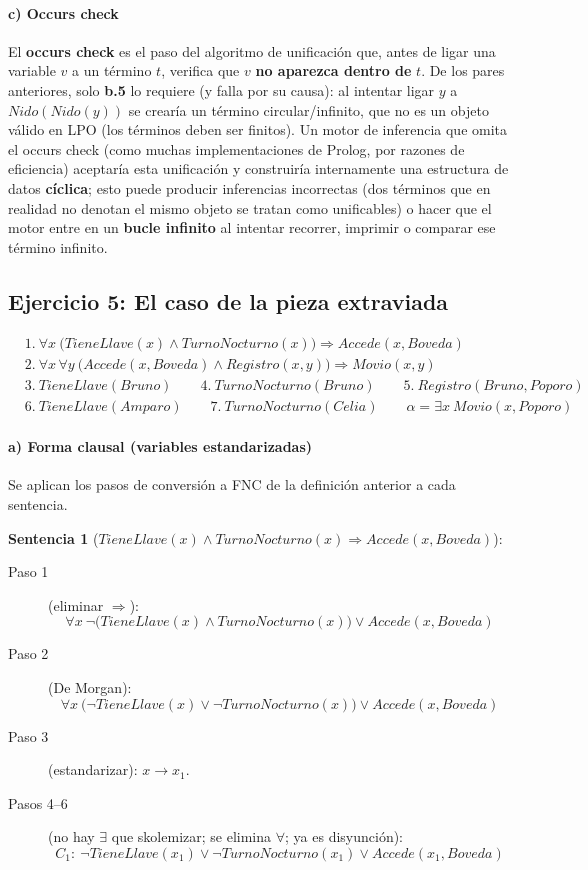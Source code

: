 \paragraph{c) Occurs check}
El \textbf{occurs check} es el paso del algoritmo de unificación que, antes de ligar una variable $v$
a un término $t$, verifica que $v$ \textbf{no aparezca dentro de} $t$. De los pares anteriores, solo
\textbf{b.5} lo requiere (y falla por su causa): al intentar ligar $y$ a $Nido(Nido(y))$ se crearía
un término circular/infinito, que no es un objeto válido en LPO (los términos deben ser finitos). Un
motor de inferencia que omita el occurs check (como muchas implementaciones de Prolog, por razones de
eficiencia) aceptaría esta unificación y construiría internamente una estructura de datos
\textbf{cíclica}; esto puede producir inferencias incorrectas (dos términos que en realidad no
denotan el mismo objeto se tratan como unificables) o hacer que el motor entre en un \textbf{bucle
infinito} al intentar recorrer, imprimir o comparar ese término infinito.

\subsection{Ejercicio 5: El caso de la pieza extraviada}

\begin{align*}
    &1.\ \forall x\ \big(TieneLlave(x)\land TurnoNocturno(x)\big) \Rightarrow Accede(x,Boveda)\\
    &2.\ \forall x\,\forall y\ \big(Accede(x,Boveda)\land Registro(x,y)\big) \Rightarrow Movio(x,y)\\
    &3.\ TieneLlave(Bruno) \qquad 4.\ TurnoNocturno(Bruno) \qquad 5.\ Registro(Bruno,Poporo)\\
    &6.\ TieneLlave(Amparo) \qquad 7.\ TurnoNocturno(Celia) \qquad \alpha = \exists x\ Movio(x,Poporo)
\end{align*}

\paragraph{a) Forma clausal (variables estandarizadas)}

Se aplican los pasos de conversión a FNC de la definición anterior a cada sentencia.

\textbf{Sentencia 1} ($TieneLlave(x)\land TurnoNocturno(x) \Rightarrow Accede(x,Boveda)$):
\begin{description}
    \item[Paso 1] (eliminar $\Rightarrow$):
    \[
        \forall x\ \neg\big(TieneLlave(x)\land TurnoNocturno(x)\big) \lor Accede(x,Boveda)
    \]
    \item[Paso 2] (De Morgan):
    \[
        \forall x\ \big(\neg TieneLlave(x)\lor\neg TurnoNocturno(x)\big) \lor Accede(x,Boveda)
    \]
    \item[Paso 3] (estandarizar): $x\to x_1$.
    \item[Pasos 4--6] (no hay $\exists$ que skolemizar; se elimina $\forall$; ya es disyunción):
    \[
        C_1:\ \neg TieneLlave(x_1) \lor \neg TurnoNocturno(x_1) \lor Accede(x_1,Boveda)
    \]
\end{description}

